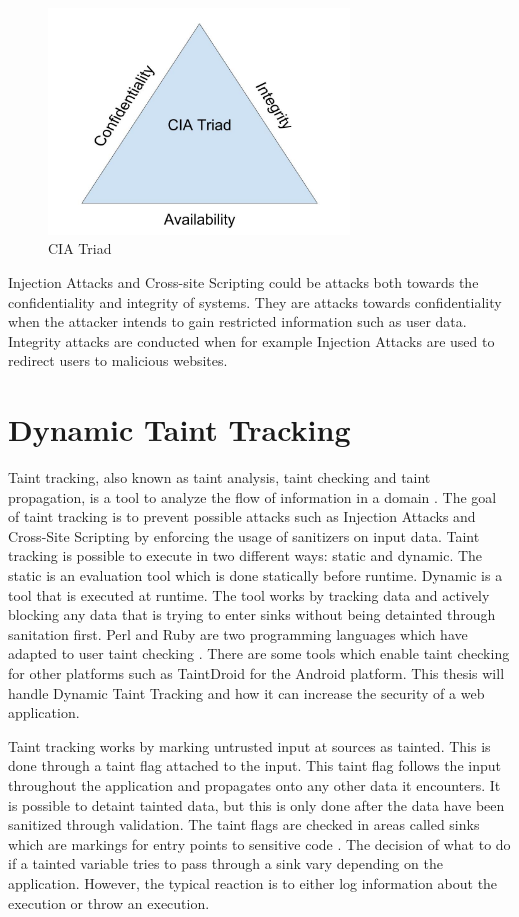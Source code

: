 \begin{figure}
    \centering
    \includegraphics[height=6cm]{images/CIATriad.jpg}
    \caption{CIA Triad}
    \label{fig:CIATriad}
\end{figure}

Injection Attacks and Cross-site Scripting could be attacks both towards the confidentiality and integrity of systems. They are attacks towards confidentiality when the attacker intends to gain restricted information such as user data. Integrity attacks are conducted when for example Injection Attacks are used to redirect users to malicious websites.



\section{Dynamic Taint Tracking}
\label{DynamicTaintTracking}
Taint tracking, also known as taint analysis, taint checking and taint propagation, is a tool to analyze the flow of information in a domain \parencite{Pan2015}. The goal of taint tracking is to prevent possible attacks such as Injection Attacks and Cross-Site Scripting by enforcing the usage of sanitizers on input data. Taint tracking is possible to execute in two different ways: static and dynamic. The static is an evaluation tool which is done statically before runtime. Dynamic is a tool that is executed at runtime. The tool works by tracking data and actively blocking any data that is trying to enter sinks without being detainted through sanitation first. Perl and Ruby are two programming languages which have adapted to user taint checking \parencite{perl, ruby}. There are some tools which enable taint checking for other platforms such as TaintDroid \parencite{Ma2010} for the Android platform. This thesis will handle Dynamic Taint Tracking and how it can increase the security of a web application.

Taint tracking works by marking untrusted input at sources as tainted. This is done through a taint flag attached to the input. This taint flag follows the input throughout the application and propagates onto any other data it encounters. It is possible to detaint tainted data, but this is only done after the data have been sanitized through validation. The taint flags are checked in areas called sinks which are markings for entry points to sensitive code \parencite{Pan2015, Venkataramani2008}. The decision of what to do if a tainted variable tries to pass through a sink vary depending on the application. However, the typical reaction is to either log information about the execution or throw an execution.

